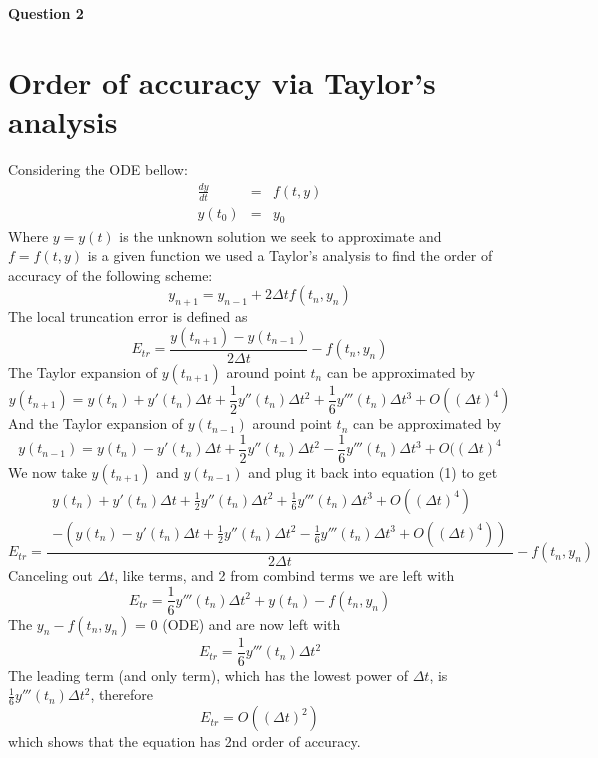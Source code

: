 \documentclass[12pt]{article}
\begin{document}
\newpage
\clearpage
\centerline{\Large\textbf{Question 2}}
\section{Order of accuracy via Taylor’s analysis}
Considering the ODE bellow:
 \begin{eqnarray}
\frac{dy}{dt} &= &f(t, y) \\\nonumber
y(t_0) &=& y_0
       \end{eqnarray}
Where $y = y(t)$ is the unknown solution we seek to approximate and $f = f(t, y)$ is a given
function we used a Taylor’s analysis to find the order of accuracy of the following scheme:
\begin{equation}
y_{n+1} = y_{n-1} + 2 \Delta t f(t_n,y_n)\nonumber
\end{equation}
The local truncation error is defined as
\begin{equation}
E_{tr}= \frac{y(t_{n+1})-y(t_{n-1})}{ 2 \Delta t} - f(t_n,y_n)
\end{equation}
The Taylor expansion of $y(t_{n+1})$ around point $t_n$ can be approximated by
\begin{equation}
y(t_{n+1})=y(t_{n})+y'(t_{n})\Delta t  + \frac{1}{2}y''(t_{n})\Delta t^2 +  \frac{1}{6}y'''(t_{n})\Delta t^3 +O((\Delta t)^4)\nonumber
\end{equation}
And the Taylor expansion of $y(t_{n-1})$ around point $t_n$ can be approximated by
\begin{equation}
y(t_{n-1})=y(t_{n})-y'(t_{n})\Delta t  + \frac{1}{2}y''(t_{n})\Delta t^2 -  \frac{1}{6}y'''(t_{n})\Delta t^3 +O((\Delta t)^4\nonumber
\end{equation}
We now take $y(t_{n+1})$ and $y(t_{n-1})$ and plug it back into equation (1) to get
$$
E_{tr}=\frac{ \begin{array}{rl}
y(t_{n})+y'(t_{n})\Delta t  + \frac{1}{2}y''(t_{n})\Delta t^2 +  \frac{1}{6}y'''(t_{n})\Delta t^3 +O((\Delta t)^4)  \\
- (y(t_{n})-y'(t_{n})\Delta t  + \frac{1}{2}y''(t_{n})\Delta t^2 -  \frac{1}{6}y'''(t_{n})\Delta t^3 +O((\Delta t)^4))
       \end{array} }{2\Delta t} - f(t_n,y_n)
$$
Canceling out $\Delta t$, like terms, and 2 from combind terms we are left with
\begin{equation}
E_{tr}= \frac{1}{6}y'''(t_{n})\Delta t^2 +y(t_{n})- f(t_n,y_n) \nonumber
\end{equation}
The $y_{n}- f(t_n,y_n)$  = 0 (ODE) and are now left with
\begin{equation}
E_{tr}= \frac{1}{6}y'''(t_{n})\Delta t^2
\end{equation}
The leading term (and only term), which has the lowest power of $\Delta t$, is 
$\frac{1}{6}y'''(t_{n})\Delta t^2$, therefore
\begin{equation}E_{tr}= O((\Delta t)^2)\end{equation}
which shows that the equation has 2nd order of accuracy.
\end{document}

